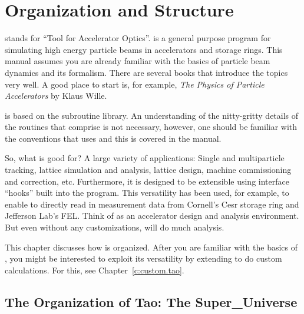 \chapter{Organization and Structure}
\label{c:organization}

\tao stands for ``Tool for Accelerator Optics''. \tao is a general purpose program for simulating
high energy particle beams in accelerators and storage rings. This manual assumes you are already
familiar with the basics of particle beam dynamics and its formalism. There are several books that
introduce the topics very well. A good place to start is, for example, \textit{The Physics of
Particle Accelerators} by Klaus Wille\cite{b:wille}.

\tao is based on the \bmad\cite{b:bmad} subroutine library. An understanding of the nitty-gritty
details of the routines that comprise \bmad is not necessary, however, one should be familiar with
the conventions that \bmad uses and this is covered in the \bmad manual.

So, what is \tao good for? A large variety of applications: Single and multiparticle tracking,
lattice simulation and analysis, lattice design, machine commissioning and correction,
etc. Furthermore, it is designed to be extensible using interface ``hooks'' built into the program.
This versatility has been used, for example, to enable \tao to directly read in measurement data
from Cornell's Cesr storage ring and Jefferson Lab's FEL. Think of \tao as an accelerator design and
analysis environment. But even without any customizations, \tao will do much analysis.

This chapter discusses how \tao is organized. After you are familiar with the basics of \tao, you
might be interested to exploit its versatility by extending \tao to do custom calculations. For
this, see Chapter~\ref{c:custom.tao}.

\section{The Organization of Tao: The Super\_Universe}
\label{s:organization}

